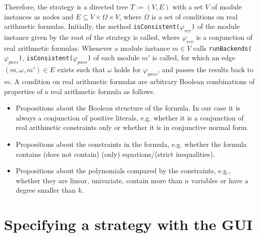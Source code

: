 Therefore, the strategy is a directed tree $T:=(V, E)$ with a set $V$ of module instances as nodes and $E\subseteq V\times \Omega\times V$, where $\Omega$ is a set of conditions on real arithmetic formulas. Initially, the method \texttt{isConsistent($\varphi_{rcv}$)} of the module instance given by the root of the strategy is called, where $\varphi_{rcv}$ is a conjunction of real arithmetic formulas. Whenever a module instance $m\in V$ calls \texttt{runBackends($\varphi_{pass}$)}, \texttt{isConsistent($\varphi_{pass}$)} of each module $m'$ is called, for which an edge $(m, \omega, m')\in E$ exists such that $\omega$ holds for $\varphi_{pass}$, and passes the results back to $m$. A condition on real arithmetic formulas are
arbitrary Boolean combinations of properties of a real arithmetic formula as follows.
\begin{itemize}
	\item Propositions about the Boolean structure of the formula. In our case it is
		always a conjunction of positive literals, e.g. whether it is a conjunction of
		real arithmetic constraints only or whether it is in conjunctive normal form.
	\item Propositions about the constraints in the formula, e.g. whether the formula contains (does not contain)
		(only) equations/(strict inequalities).
	\item Propositions about the polynomials compared by the constraints, e.g., whether they are 
		linear, univariate, contain more than $n$ variables or have a degree smaller than $k$.
\end{itemize}


\section{Specifying a strategy with the GUI}





